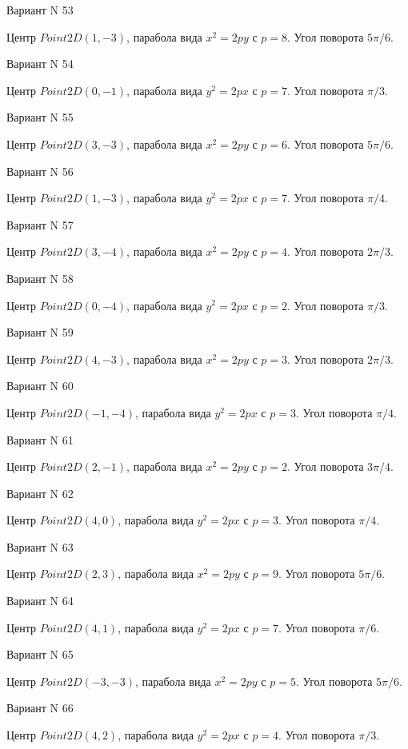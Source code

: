 \documentclass[11pt]{report}
\begin{document}
Вариант N 53

Центр $Point2D\left(1, -3\right)$, парабола вида $x^{2} = 2py$ с $p = 8$. Угол поворота $5 \pi / 6$.

Вариант N 54

Центр $Point2D\left(0, -1\right)$, парабола вида $y^{2} = 2px$ с $p = 7$. Угол поворота $\pi / 3$.

Вариант N 55

Центр $Point2D\left(3, -3\right)$, парабола вида $x^{2} = 2py$ с $p = 6$. Угол поворота $5 \pi / 6$.

Вариант N 56

Центр $Point2D\left(1, -3\right)$, парабола вида $y^{2} = 2px$ с $p = 7$. Угол поворота $\pi / 4$.

Вариант N 57

Центр $Point2D\left(3, -4\right)$, парабола вида $x^{2} = 2py$ с $p = 4$. Угол поворота $2 \pi / 3$.

Вариант N 58

Центр $Point2D\left(0, -4\right)$, парабола вида $y^{2} = 2px$ с $p = 2$. Угол поворота $\pi / 3$.

Вариант N 59

Центр $Point2D\left(4, -3\right)$, парабола вида $x^{2} = 2py$ с $p = 3$. Угол поворота $2 \pi / 3$.

Вариант N 60

Центр $Point2D\left(-1, -4\right)$, парабола вида $y^{2} = 2px$ с $p = 3$. Угол поворота $\pi / 4$.

Вариант N 61

Центр $Point2D\left(2, -1\right)$, парабола вида $x^{2} = 2py$ с $p = 2$. Угол поворота $3 \pi / 4$.

Вариант N 62

Центр $Point2D\left(4, 0\right)$, парабола вида $y^{2} = 2px$ с $p = 3$. Угол поворота $\pi / 4$.

Вариант N 63

Центр $Point2D\left(2, 3\right)$, парабола вида $x^{2} = 2py$ с $p = 9$. Угол поворота $5 \pi / 6$.

Вариант N 64

Центр $Point2D\left(4, 1\right)$, парабола вида $y^{2} = 2px$ с $p = 7$. Угол поворота $\pi / 6$.

Вариант N 65

Центр $Point2D\left(-3, -3\right)$, парабола вида $x^{2} = 2py$ с $p = 5$. Угол поворота $5 \pi / 6$.

Вариант N 66

Центр $Point2D\left(4, 2\right)$, парабола вида $y^{2} = 2px$ с $p = 4$. Угол поворота $\pi / 3$.
\end{document}

